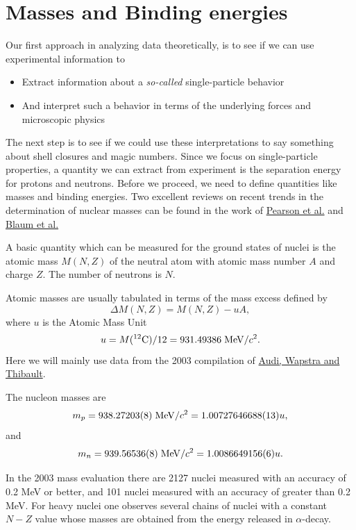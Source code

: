 \documentclass[%
oneside,                 %
final,                   %
10pt]{article}
\begin{document}
\noindent
\section*{Masses and Binding energies}
Our first approach in analyzing data theoretically, is to see if we can use experimental information to 

\begin{itemize}
\item Extract information about a \emph{so-called} single-particle  behavior

\item And interpret such a behavior in terms of the underlying forces and microscopic physics
\end{itemize}

\noindent
The next step is to see if we could use these interpretations to say something about shell closures and magic numbers. Since we focus on single-particle properties, a quantity we can extract from experiment is the separation energy for protons and neutrons. Before we proceed, we need to define quantities like masses and binding energies.   Two excellent reviews on 
recent trends in the determination of nuclear masses can be found in the work of \href{{http://journals.aps.org/rmp/abstract/10.1103/RevModPhys.75.1021}}{Pearson et al.} and \href{{http://iopscience.iop.org/1402-4896/2013/T152/014017/}}{Blaum et al.}


A basic quantity which can be measured for the ground states of nuclei is the atomic mass $M(N, Z)$ of the neutral atom with atomic mass number $A$ and charge $Z$. The number of neutrons is $N$.

Atomic masses are usually tabulated in terms of the mass excess defined by
\[
\Delta M(N, Z) =  M(N, Z) - uA,
\]
where $u$ is the Atomic Mass Unit 
\[
u = M(^{12}\mathrm{C})/12 = 931.49386 \hspace{0.1cm} \mathrm{MeV}/c^2.
\]
Here we will mainly use 
data from the 2003 compilation of \href{{http://www.sciencedirect.com/science/journal/03759474/729/1}}{Audi, Wapstra and Thibault}.


The nucleon masses are
\[
m_p = 938.27203(8)\hspace{0.1cm} \mathrm{MeV}/c^2 = 1.00727646688(13)u,
\] 
and
\[
m_n = 939.56536(8)\hspace{0.1cm} \mathrm{MeV}/c^2 = 1.0086649156(6)u.
\]

In the 2003 mass evaluation there are 2127 nuclei measured with an accuracy of 0.2
MeV or better, and 101 nuclei measured with an accuracy of greater than 0.2 MeV. For
heavy nuclei one observes several chains of nuclei with a constant $N-Z$ value whose masses are obtained from the energy released in $\alpha$-decay.
\end{document}
